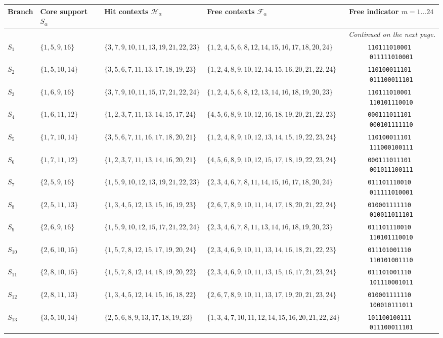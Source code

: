 \documentclass[aps,pra,reprint,superscriptaddress,longbibliography,nofootinbib,floatfix,10pt]{revtex4-2}
\theoremstyle{definition}
\begin{document}
\begin{longtable}{llllc}
Branch & Core support $S_\alpha$ & Hit contexts $\mathcal H_\alpha$ & Free contexts $\mathcal F_\alpha$ & Free indicator $m=1\ldots 24$ \\\midrule
\endhead
\midrule
\multicolumn{5}{r}{\emph{Continued on the next page.}}\\
\endfoot
\bottomrule\endlastfoot
$S_{1}$ & $\{1,5,9,16\}$ & $\{3,7,9,10,11,13,19,21,22,23\}$ & $\{1,2,4,5,6,8,12,14,15,16,17,18,20,24\}$ & \texttt{110111010001\,011111010001} \\
$S_{2}$ & $\{1,5,10,14\}$ & $\{3,5,6,7,11,13,17,18,19,23\}$ & $\{1,2,4,8,9,10,12,14,15,16,20,21,22,24\}$ & \texttt{110100011101\,011100011101} \\
$S_{3}$ & $\{1,6,9,16\}$ & $\{3,7,9,10,11,15,17,21,22,24\}$ & $\{1,2,4,5,6,8,12,13,14,16,18,19,20,23\}$ & \texttt{110111010001\,110101110010} \\
$S_{4}$ & $\{1,6,11,12\}$ & $\{1,2,3,7,11,13,14,15,17,24\}$ & $\{4,5,6,8,9,10,12,16,18,19,20,21,22,23\}$ & \texttt{000111011101\,000101111110} \\
$S_{5}$ & $\{1,7,10,14\}$ & $\{3,5,6,7,11,16,17,18,20,21\}$ & $\{1,2,4,8,9,10,12,13,14,15,19,22,23,24\}$ & \texttt{110100011101\,111000100111} \\
$S_{6}$ & $\{1,7,11,12\}$ & $\{1,2,3,7,11,13,14,16,20,21\}$ & $\{4,5,6,8,9,10,12,15,17,18,19,22,23,24\}$ & \texttt{000111011101\,001011100111} \\
$S_{7}$ & $\{2,5,9,16\}$ & $\{1,5,9,10,12,13,19,21,22,23\}$ & $\{2,3,4,6,7,8,11,14,15,16,17,18,20,24\}$ & \texttt{011101110010\,011111010001} \\
$S_{8}$ & $\{2,5,11,13\}$ & $\{1,3,4,5,12,13,15,16,19,23\}$ & $\{2,6,7,8,9,10,11,14,17,18,20,21,22,24\}$ & \texttt{010001111110\,010011011101} \\
$S_{9}$ & $\{2,6,9,16\}$ & $\{1,5,9,10,12,15,17,21,22,24\}$ & $\{2,3,4,6,7,8,11,13,14,16,18,19,20,23\}$ & \texttt{011101110010\,110101110010} \\
$S_{10}$ & $\{2,6,10,15\}$ & $\{1,5,7,8,12,15,17,19,20,24\}$ & $\{2,3,4,6,9,10,11,13,14,16,18,21,22,23\}$ & \texttt{011101001110\,110101001110} \\
$S_{11}$ & $\{2,8,10,15\}$ & $\{1,5,7,8,12,14,18,19,20,22\}$ & $\{2,3,4,6,9,10,11,13,15,16,17,21,23,24\}$ & \texttt{011101001110\,101110001011} \\
$S_{12}$ & $\{2,8,11,13\}$ & $\{1,3,4,5,12,14,15,16,18,22\}$ & $\{2,6,7,8,9,10,11,13,17,19,20,21,23,24\}$ & \texttt{010001111110\,100010111011} \\
$S_{13}$ & $\{3,5,10,14\}$ & $\{2,5,6,8,9,13,17,18,19,23\}$ & $\{1,3,4,7,10,11,12,14,15,16,20,21,22,24\}$ & \texttt{101100100111\,011100011101} \\

\end{longtable}
\end{document}
